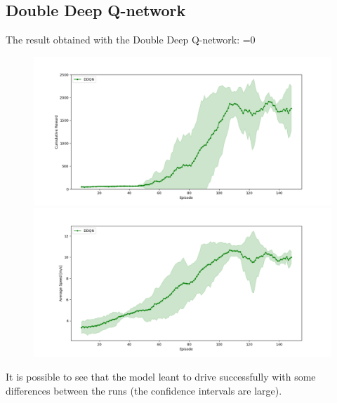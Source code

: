 \documentclass[14pt]{extarticle}
\def\sp{\vspace{5pt}}
\newcounter{debug}
\begin{document}
\begin{flushleft}
\subsection{Double Deep Q-network}
\sp
The result obtained with the Double Deep Q-network:
\vspace{-5mm}
\ifnum\value{debug}=0 {
	\begin{figure}[H]
    		\centering\includegraphics[width=1\textwidth]{./Image/Results/DD/plot1_reward.png}
    		\vspace{-5mm}
    		\centering\includegraphics[width=1\textwidth]{./Image/Results/DD/plot1_speed.png}
	\end{figure}
	}\fi
	It is possible to see that the model leant to drive successfully with some differences between the runs (the confidence intervals are large).
	

\end{flushleft}
\end{document}
